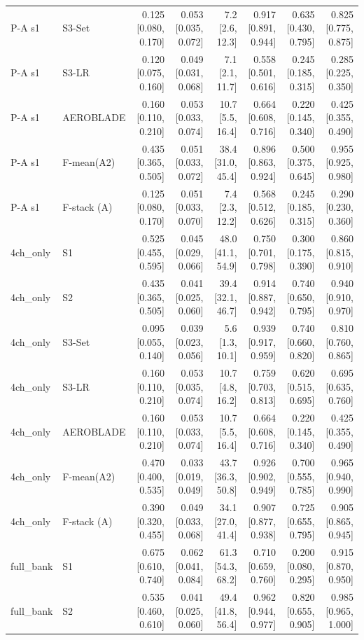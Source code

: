 \begin{table}[htbp]
\begin{tabular}{llrrrrrr}
P-A s1 & S3-Set & 0.125 [0.080, 0.170] & 0.053 [0.035, 0.072] & 7.2 [2.6, 12.3] & 0.917 [0.891, 0.944] & 0.635 [0.430, 0.795] & 0.825 [0.775, 0.875] \\
P-A s1 & S3-LR & 0.120 [0.075, 0.160] & 0.049 [0.031, 0.068] & 7.1 [2.1, 11.7] & 0.558 [0.501, 0.616] & 0.245 [0.185, 0.315] & 0.285 [0.225, 0.350] \\
P-A s1 & AEROBLADE & 0.160 [0.110, 0.210] & 0.053 [0.033, 0.074] & 10.7 [5.5, 16.4] & 0.664 [0.608, 0.716] & 0.220 [0.145, 0.340] & 0.425 [0.355, 0.490] \\
P-A s1 & F-mean(A2) & 0.435 [0.365, 0.505] & 0.051 [0.033, 0.072] & 38.4 [31.0, 45.4] & 0.896 [0.863, 0.924] & 0.500 [0.375, 0.645] & 0.955 [0.925, 0.980] \\
P-A s1 & F-stack (A) & 0.125 [0.080, 0.170] & 0.051 [0.033, 0.070] & 7.4 [2.3, 12.2] & 0.568 [0.512, 0.626] & 0.245 [0.185, 0.315] & 0.290 [0.230, 0.360] \\
4ch\_only & S1 & 0.525 [0.455, 0.595] & 0.045 [0.029, 0.066] & 48.0 [41.1, 54.9] & 0.750 [0.701, 0.798] & 0.300 [0.175, 0.390] & 0.860 [0.815, 0.910] \\
4ch\_only & S2 & 0.435 [0.365, 0.505] & 0.041 [0.025, 0.060] & 39.4 [32.1, 46.7] & 0.914 [0.887, 0.942] & 0.740 [0.650, 0.795] & 0.940 [0.910, 0.970] \\
4ch\_only & S3-Set & 0.095 [0.055, 0.140] & 0.039 [0.023, 0.056] & 5.6 [1.3, 10.1] & 0.939 [0.917, 0.959] & 0.740 [0.660, 0.820] & 0.810 [0.760, 0.865] \\
4ch\_only & S3-LR & 0.160 [0.110, 0.210] & 0.053 [0.035, 0.074] & 10.7 [4.8, 16.2] & 0.759 [0.703, 0.813] & 0.620 [0.515, 0.695] & 0.695 [0.635, 0.760] \\
4ch\_only & AEROBLADE & 0.160 [0.110, 0.210] & 0.053 [0.033, 0.074] & 10.7 [5.5, 16.4] & 0.664 [0.608, 0.716] & 0.220 [0.145, 0.340] & 0.425 [0.355, 0.490] \\
4ch\_only & F-mean(A2) & 0.470 [0.400, 0.535] & 0.033 [0.019, 0.049] & 43.7 [36.3, 50.8] & 0.926 [0.902, 0.949] & 0.700 [0.555, 0.785] & 0.965 [0.940, 0.990] \\
4ch\_only & F-stack (A) & 0.390 [0.320, 0.455] & 0.049 [0.033, 0.068] & 34.1 [27.0, 41.4] & 0.907 [0.877, 0.938] & 0.725 [0.655, 0.795] & 0.905 [0.865, 0.945] \\
full\_bank & S1 & 0.675 [0.610, 0.740] & 0.062 [0.041, 0.084] & 61.3 [54.3, 68.2] & 0.710 [0.659, 0.760] & 0.200 [0.080, 0.295] & 0.915 [0.870, 0.950] \\
full\_bank & S2 & 0.535 [0.460, 0.610] & 0.041 [0.025, 0.060] & 49.4 [41.8, 56.4] & 0.962 [0.944, 0.977] & 0.820 [0.655, 0.905] & 0.985 [0.965, 1.000] \\

\end{tabular}
\end{table}
